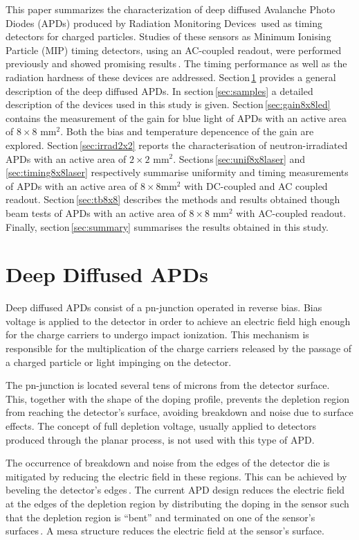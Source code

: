 \documentclass{article}
\begin{document}
This paper summarizes the characterization of deep diffused Avalanche Photo Diodes (APDs) produced by Radiation Monitoring Devices\,\cite{rmdAddress} used as timing detectors for charged particles.
Studies of these sensors as Minimum Ionising Particle (MIP) timing detectors, using an AC-coupled readout, were performed previously and showed promising results\,\cite{white2014}.
The timing performance as well as the radiation hardness of these devices are addressed.
Section\,\ref{sec:ddApds} provides a general description of the deep diffused APDs.
In section\,\ref{sec:samples} a detailed description of the devices used in this study is given.
Section\,\ref{sec:gain8x8led} contains the measurement of the gain for blue light of APDs with an active area of $8 \times 8$ mm$^2$. Both the bias and temperature depencence of the gain are explored.
Section\,\ref{sec:irrad2x2} reports the characterisation of neutron-irradiated APDs with an active area of $2 \times 2$ mm$^2$.
Sections\,\ref{sec:unif8x8laser} and\,\ref{sec:timing8x8laser} respectively summarise uniformity and timing measurements of APDs with an active area of $8 \times 8$mm$^2$ with DC-coupled and AC coupled readout.
Section\,\ref{sec:tb8x8} describes the methods and results obtained though beam tests of APDs with an active area of $8 \times 8$ mm$^2$ with AC-coupled readout.
Finally, section\,\ref{sec:summary} summarises the results obtained in this study.


\section{Deep Diffused APDs}
\label{sec:ddApds}

Deep diffused APDs consist of a pn-junction operated in reverse bias.
Bias voltage is applied to the detector in order to achieve an electric field high enough for the charge carriers to undergo impact ionization.
This mechanism is responsible for the multiplication of the charge carriers released by the passage of a charged particle or light impinging on the detector.

The pn-junction is located several tens of microns from the detector surface.
This, together with the shape of the doping profile, prevents the depletion region from reaching the detector's surface, avoiding breakdown and noise due to surface effects.
The concept of full depletion voltage, usually applied to detectors produced through the planar process, is not used with this type of APD.

The occurrence of breakdown and noise from the edges of the detector die is mitigated by reducing the electric field in these regions.
This can be achieved by beveling the detector's edges\,\cite{mcclish2004}.
The current APD design reduces the electric field at the edges of the depletion region by distributing the doping in the sensor such that the depletion region is ``bent'' and terminated on one of the sensor's surfaces\,\cite{mcclish2004}.
A mesa structure reduces the electric field at the sensor's surface.
\end{document}
